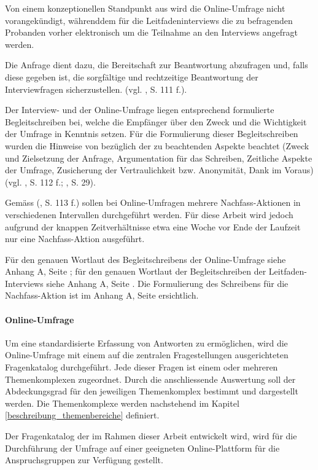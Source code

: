\documentclass[../../main.tex]{subfiles}
\begin{document}
\begin{sloppypar}
Von einem konzeptionellen Standpunkt aus wird die Online-Umfrage nicht vorangekündigt, währenddem für die Leitfadeninterviews die zu befragenden Probanden vorher elektronisch um die Teilnahme an den Interviews angefragt werden. 

Die Anfrage dient dazu, die Bereitschaft zur Beantwortung abzufragen und, falls diese gegeben ist, die sorgfältige und rechtzeitige Beantwortung der Interviewfragen sicherzustellen. (vgl. \citeauthor{berekoven_marktforschung:_2009} \citeyear{berekoven_marktforschung:_2009}, S. 111 f.).

Der Interview- und der Online-Umfrage liegen entsprechend formulierte Begleitschreiben bei, welche die Empfänger über den Zweck und die Wichtigkeit der Umfrage in Kenntnis setzen. Für die Formulierung dieser Begleitschreiben wurden die Hinweise von \citeauthor{berekoven_marktforschung:_2009} bezüglich der zu beachtenden Aspekte beachtet (Zweck und Zielsetzung der Anfrage, Argumentation für das Schreiben, Zeitliche Aspekte der Umfrage, Zusicherung der Vertraulichkeit bzw. Anonymität, Dank im Voraus) (vgl. \citeauthor{berekoven_marktforschung:_2009} \citeyear{berekoven_marktforschung:_2009}, S. 112 f.; \citeauthor{kirchhoff_fragebogen:_2010} \citeyear{kirchhoff_fragebogen:_2010}, S. 29).

Gemäss \citeauthor{berekoven_marktforschung:_2009} (\citeyear{berekoven_marktforschung:_2009}, S. 113 f.) sollen bei Online-Umfragen mehrere Nachfass-Aktionen in verschiedenen Intervallen durchgeführt werden. Für diese Arbeit wird jedoch aufgrund der knappen Zeitverhältnisse etwa eine Woche vor Ende der Laufzeit nur eine Nachfass-Aktion ausgeführt.

Für den genauen Wortlaut des Begleitschreibens der Online-Umfrage siehe Anhang A, Seite \pageref{begleitschreiben_online_umfrage}; für den genauen Wortlaut der Begleitschreiben der Leitfaden-Interviews siehe Anhang A, Seite \pageref{begleitschreiben_interview}. Die Formulierung des Schreibens für die Nachfass-Aktion ist im Anhang A, Seite \pageref{nachfassung_online_umfrage} ersichtlich.

\end{sloppypar}

\paragraph*{Online-Umfrage}\mbox{}

\begin{sloppypar}
Um eine standardisierte Erfassung von Antworten zu ermöglichen, wird die Online-Umfrage mit einem auf die zentralen Fragestellungen ausgerichteten Fragenkatalog durchgeführt. Jede dieser Fragen ist einem oder mehreren Themenkomplexen zugeordnet. Durch die anschliessende Auswertung soll der Abdeckungsgrad für den jeweiligen Themenkomplex bestimmt und dargestellt werden. Die Themenkomplexe werden nachstehend im Kapitel \ref{beschreibung_themenbereiche} definiert.

Der Fragenkatalog der im Rahmen dieser Arbeit entwickelt wird, wird für die Durchführung der Umfrage auf einer geeigneten Online-Plattform für die Anspruchsgruppen zur Verfügung gestellt.
\end{sloppypar}
\end{document}

